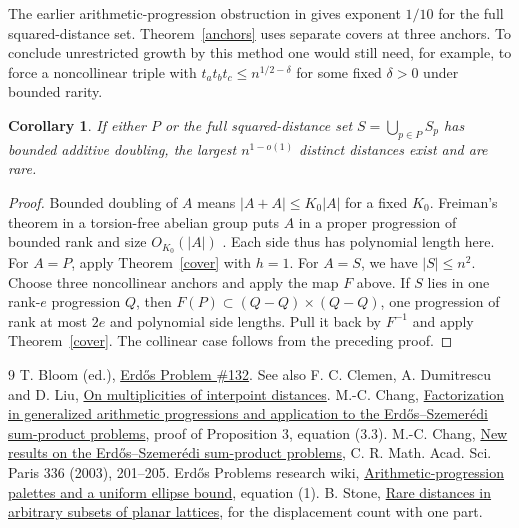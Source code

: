 \documentclass[10pt,letterpaper]{article}
\newtheorem{corollary}[theorem]{Corollary}
\begin{document}
The earlier arithmetic-progression obstruction in \cite{palette} gives exponent $1/10$ for the full squared-distance set. Theorem~\ref{anchors} uses separate covers at three anchors. To conclude unrestricted growth by this method one would still need, for example, to force a noncollinear triple with $t_at_bt_c\le n^{1/2-\delta}$ for some fixed $\delta>0$ under bounded rarity.

\begin{corollary}
If either $P$ or the full squared-distance set $S=\bigcup_{p\in P}S_p$ has bounded additive doubling, the largest $n^{1-o(1)}$ distinct distances exist and are rare.
\end{corollary}
\begin{proof}
Bounded doubling of $A$ means $|A+A|\le K_0|A|$ for a fixed $K_0$. Freiman's theorem in a torsion-free abelian group puts $A$ in a proper progression of bounded rank and size $O_{K_0}(|A|)$ \cite[Section 3]{survey}. Each side thus has polynomial length here. For $A=P$, apply Theorem~\ref{cover} with $h=1$. For $A=S$, we have $|S|\le n^2$. Choose three noncollinear anchors and apply the map $F$ above. If $S$ lies in one rank-$e$ progression $Q$, then $F(P)\subset(Q-Q)\times(Q-Q)$, one progression of rank at most $2e$ and polynomial side lengths. Pull it back by $F^{-1}$ and apply Theorem~\ref{cover}. The collinear case follows from the preceding proof.
\end{proof}

\begin{thebibliography}{9}
 T. Bloom (ed.), \href{https://www.erdosproblems.com/132}{Erd\H{o}s Problem \#132}. See also F. C. Clemen, A. Dumitrescu and D. Liu, \href{https://arxiv.org/abs/2505.04283}{On multiplicities of interpoint distances}.
 M.-C. Chang, \href{https://math.ucr.edu/~mcc/paper/110%20Factor.pdf}{Factorization in generalized arithmetic progressions and application to the Erd\H{o}s--Szemer\'edi sum-product problems}, proof of Proposition 3, equation (3.3).
 M.-C. Chang, \href{https://doi.org/10.1016/S1631-073X(03)00018-9}{New results on the Erd\H{o}s--Szemer\'edi sum-product problems}, C. R. Math. Acad. Sci. Paris 336 (2003), 201--205.
 Erd\H{o}s Problems research wiki, \href{https://erdosproblems.ai/wiki/research/erdos_132/arithmetic_palettes}{Arithmetic-progression palettes and a uniform ellipse bound}, equation (1).
 B. Stone, \href{https://github.com/blakestone-x/math/blob/75688d782eca12f48b345a79e793f4ad6b25d49e/Erdos-132-convex-lattice/arbitrary-subsets.md}{Rare distances in arbitrary subsets of planar lattices}, for the displacement count with one part.
\end{thebibliography}
\end{document}
